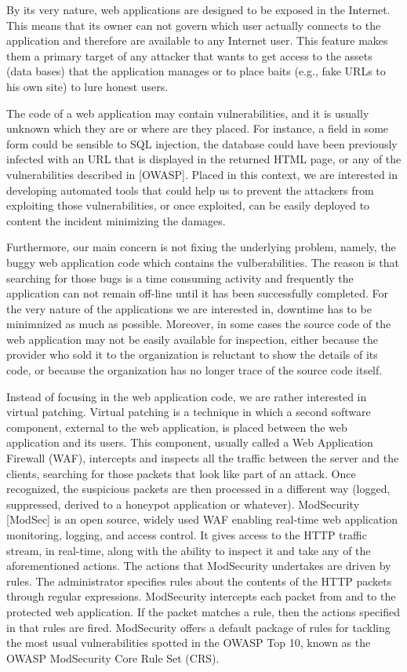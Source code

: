 \documentclass[runningheads,a4paper]{llncs}
\begin{document}
By its very nature, web applications are designed to be exposed in the Internet. This means that its owner can not govern which user actually connects to the application and  therefore are available to any Internet user. This feature makes them a primary target of any attacker that wants to get access to the assets (data bases) that the application manages or to place baits (e.g., fake URLs to his own site) to lure honest users.


The code of a web application may contain vulnerabilities, and it is usually unknown which they are or where are they placed. For instance, a field in some form could be sensible to SQL injection, the database could have been previously infected with an URL that is displayed in the returned HTML page, or any of the vulnerabilities described in [OWASP]. Placed in this context, we are interested in developing automated tools that could help us to prevent the attackers from exploiting those vulnerabilities, or once exploited, can be easily deployed to content the incident minimizing the damages. 

Furthermore, our main concern is not fixing the underlying problem, namely, the buggy web application code which contains the vulberabilities. The reason is that searching for those bugs is a time consuming activity and frequently the application can not remain off-line until it has been successfully completed. For the very nature of the applications we are interested in, downtime has to be minimnized as much as possible. Moreover, in some cases the source code of the web application may not be easily available for inspection, either because the provider who sold it to the organization is reluctant to show the details of its code, or because the organization has no longer trace of the source code itself.

Instead of focusing in the web application code, we are rather interested in virtual patching. Virtual patching is a technique in which a second software component, external to the web application, is placed between the web application and its users. This component, usually called a Web Application Firewall (WAF), intercepts and inspects all the traffic between the server and the clients, searching for those packets that look like part of an attack. Once recognized, the suspicious packets are then processed in a different way (logged, suppressed, derived to a honeypot application or whatever). ModSecurity [ModSec] is an open source, widely used WAF enabling real-time web application monitoring, logging, and access control. It gives access to the HTTP traffic stream, in real-time, along with the ability to inspect it and take any of the aforementioned actions. 
The actions that ModSecurity undertakes are driven by rules. The administrator specifies rules about the contents of the HTTP packets through regular expressions. ModSecurity intercepts each packet from and to the protected web application. If the packet matches a rule, then the actions specified in that rules are fired. ModSecurity offers a default package of rules for tackling the most usual vulnerabilities spotted in the OWASP Top 10, known as the OWASP ModSecurity Core Rule Set (CRS). 
\end{document}
